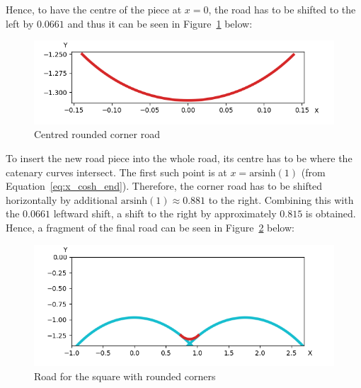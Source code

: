 \documentclass[12pt]{article}
\begin{document}
        Hence, to have the centre of the piece at $x=0$, the road has to be shifted to the left by $0.0661$ and thus it can be seen in Figure~\ref{fig:corner_road_centered} below:
        \begin{figure}[H]
            \includegraphics[width=\linewidth]{images/centered_corner_road.png}
            \caption{Centred rounded corner road}\label{fig:corner_road_centered}
        \end{figure}

        To insert the new road piece into the whole road, its centre has to be where the catenary curves intersect. The first such point is at $x=\text{arsinh}(1)$ (from Equation~\ref{eq:x_cosh_end}). Therefore, the corner road has to be shifted horizontally by additional $\text{arsinh}(1) \approx 0.881$ to the right. Combining this with the $0.0661$ leftward shift, a shift to the right by approximately $0.815$ is obtained. Hence, a fragment of the final road can be seen in Figure~\ref{fig:corner_road_full} below:
        \begin{figure}[H]
            \includegraphics[width=\linewidth]{images/road_with_corner.png}
            \caption{Road for the square with rounded corners}\label{fig:corner_road_full}
        \end{figure}
\end{document}
